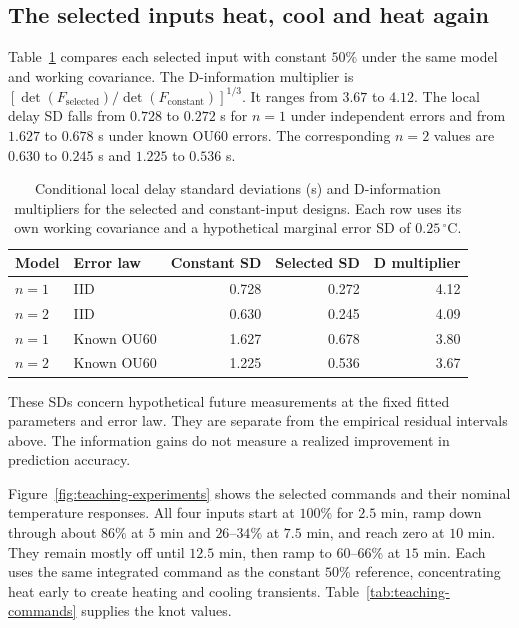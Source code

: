 \documentclass[11pt]{article}
\begin{document}
\subsection{The selected inputs heat, cool and heat again}
Table~\ref{tab:teaching-doe} compares each selected input with constant $50\%$
under the same model and working covariance. The D-information multiplier is
$[\det(F_{\mathrm{selected}})/\det(F_{\mathrm{constant}})]^{1/3}$.
It ranges from $3.67$ to $4.12$. The local delay SD falls from
$0.728$ to $0.272$ s for $n=1$ under independent errors and from
$1.627$ to $0.678$ s under known OU60 errors. The corresponding $n=2$ values
are $0.630$ to $0.245$ s and $1.225$ to $0.536$ s.

\begin{table}[htbp]
\centering
\small
\caption{Conditional local delay standard deviations (s) and D-information multipliers for the selected and constant-input designs. Each row uses its own working covariance and a hypothetical marginal error SD of $0.25\,{}^\circ\mathrm C$.}
\label{tab:teaching-doe}
\begin{tabular}{llrrr}
\toprule
Model & Error law & Constant SD & Selected SD & D multiplier \\
\midrule
$n=1$ & IID & 0.728 & 0.272 & 4.12 \\
$n=2$ & IID & 0.630 & 0.245 & 4.09 \\
$n=1$ & Known OU60 & 1.627 & 0.678 & 3.80 \\
$n=2$ & Known OU60 & 1.225 & 0.536 & 3.67 \\
\bottomrule
\end{tabular}
\end{table}



These SDs concern hypothetical future measurements at the fixed fitted
parameters and error law. They are separate from the empirical residual
intervals above. The information gains do not measure a realized improvement
in prediction accuracy.

Figure~\ref{fig:teaching-experiments} shows the selected commands and their
nominal temperature responses. All four inputs start at $100\%$ for $2.5$ min,
ramp down through about $86\%$ at $5$ min and $26$--$34\%$ at $7.5$ min,
and reach zero at $10$ min. They remain mostly off until $12.5$ min, then ramp
to $60$--$66\%$ at $15$ min. Each uses the same integrated command as the
constant $50\%$ reference, concentrating heat early to create heating and
cooling transients. Table~\ref{tab:teaching-commands} supplies the knot values.
\end{document}
